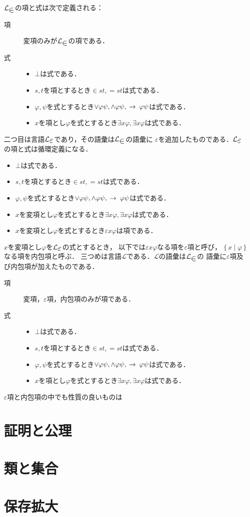 \documentclass[twocolumn,10pt]{jarticle}
\theoremstyle{mystyle}
\newcommand{\lang}[1]{\mathcal{L}_{\scalebox{1.2}{$#1$}}} %
\newcommand{\Set}[2]{\{\, #1 \mid #2\, \}} %
\newcommand{\rarrow}{\hspace{0.25em}\rightarrow\hspace{0.25em}} %
\begin{document}
	$\lang{\in}$の項と式は次で定義される：
	
	\begin{description}
		\item[項] 変項のみが$\lang{\in}$の項である．
		\item[式] 
			\begin{itemize}
				\item $\bot$は式である．
				\item $s,t$を項とするとき$\in st, =st$は式である．
				\item $\varphi,\psi$を式とするとき$\vee \varphi\psi,\wedge \varphi \psi,\rarrow \varphi \psi$は式である．
				\item $x$を項とし$\varphi$を式とするとき$\exists x \varphi,\exists x \varphi$は式である．
			\end{itemize}
	\end{description}
	
	二つ目は言語$\lang{\varepsilon}$であり，その語彙は$\lang{\in}$の語彙に
	$\varepsilon$を追加したものである．$\lang{\varepsilon}$の項と式は循環定義になる．
	
	\begin{itemize}
		\item $\bot$は式である．
		\item $s,t$を項とするとき$\in st, =st$は式である．
		\item $\varphi,\psi$を式とするとき$\vee \varphi\psi,\wedge \varphi \psi,\rarrow \varphi \psi$は式である．
		\item $x$を変項とし$\varphi$を式とするとき$\exists x \varphi,\exists x \varphi$は式である．
		\item $x$を変項とし$\varphi$を式とするとき$\varepsilon x \varphi$は項である．
	\end{itemize}
	
	$x$を変項とし$\varphi$を$\lang{\varepsilon}$の式とするとき，
	以下では$\varepsilon x \varphi$なる項を$\varepsilon$項と呼び，
	$\Set{x}{\varphi}$なる項を内包項と呼ぶ．
	三つめは言語$\mathcal{L}$である．$\mathcal{L}$の語彙は$\lang{\in}$の
	語彙に$\varepsilon$項及び内包項が加えたものである．
	
	\begin{description}
		\item[項] 変項，$\varepsilon$項，内包項のみが項である．
		\item[式] 
			\begin{itemize}
				\item $\bot$は式である．
				\item $s,t$を項とするとき$\in st, =st$は式である．
				\item $\varphi,\psi$を式とするとき$\vee \varphi\psi,\wedge \varphi \psi,\rarrow \varphi \psi$は式である．
				\item $x$を項とし$\varphi$を式とするとき$\exists x \varphi,\exists x \varphi$は式である．
			\end{itemize}
	\end{description}
	
	$\varepsilon$項と内包項の中でも性質の良いものは
	
\section{証明と公理}
\section{類と集合}
\section{保存拡大}
\end{document}

